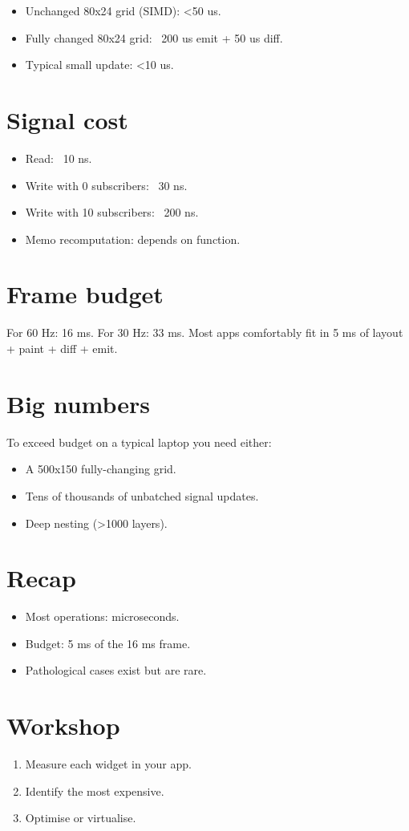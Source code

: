 \begin{itemize}[leftmargin=*]
  \item Unchanged 80x24 grid (SIMD): <50 us.
  \item Fully changed 80x24 grid: ~200 us emit + 50 us diff.
  \item Typical small update: <10 us.
\end{itemize}

\section{Signal cost}

\begin{itemize}[leftmargin=*]
  \item Read: ~10 ns.
  \item Write with 0 subscribers: ~30 ns.
  \item Write with 10 subscribers: ~200 ns.
  \item Memo recomputation: depends on function.
\end{itemize}

\section{Frame budget}

For 60 Hz: 16 ms. For 30 Hz: 33 ms. Most apps comfortably
fit in 5 ms of layout + paint + diff + emit.

\section{Big numbers}

To exceed budget on a typical laptop you need either:

\begin{itemize}[leftmargin=*]
  \item A 500x150 fully-changing grid.
  \item Tens of thousands of unbatched signal updates.
  \item Deep nesting (>1000 layers).
\end{itemize}

\section{Recap}

\begin{recap}
\begin{itemize}[leftmargin=*]
  \item Most operations: microseconds.
  \item Budget: 5 ms of the 16 ms frame.
  \item Pathological cases exist but are rare.
\end{itemize}
\end{recap}

\section*{Workshop}

\begin{enumerate}[leftmargin=*]
  \item Measure each widget in your app.
  \item Identify the most expensive.
  \item Optimise or virtualise.
\end{enumerate}
